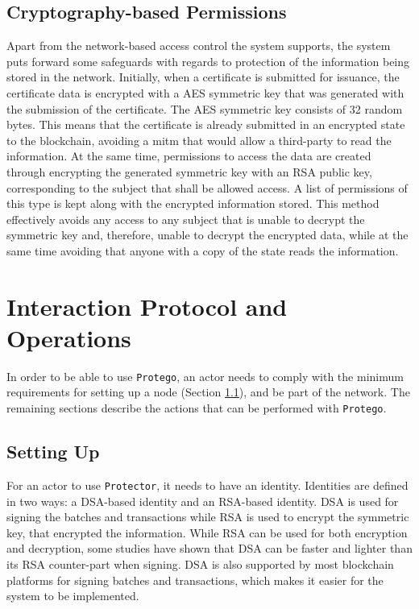\subsection{Cryptography-based Permissions}

Apart from the network-based access control the system supports, the system puts forward some safeguards with regards to protection of the information being stored in the network. Initially, when a certificate is submitted for issuance, the certificate data is encrypted with a AES symmetric key that was generated with the submission of the certificate. The AES symmetric key consists of 32 random bytes. This means that the certificate is already submitted in an encrypted state to the blockchain, avoiding a \gls{mitm} that would allow a third-party to read the information. At the same time, permissions to access the data are created through encrypting the generated symmetric key with an RSA public key, corresponding to the subject that shall be allowed access. A list of permissions of this type is kept along with the encrypted information stored. This method effectively avoids any access to any subject that is unable to decrypt the symmetric key and, therefore, unable to decrypt the encrypted data, while at the same time avoiding that anyone with a copy of the state reads the information.

\section{Interaction Protocol and Operations}
\label{sec:design-interaction}

In order to be able to use \texttt{Protego}, an actor needs to comply with the minimum requirements for setting up a node (Section \ref{sec:design-setup}), and be part of the network. The remaining sections describe the actions that can be performed with \texttt{Protego}.

\subsection{Setting Up}
\label{sec:design-setup}

For an actor to use \texttt{Protector}, it needs to have an identity. Identities are defined in two ways: a DSA-based identity and an RSA-based identity. DSA is used for signing the batches and transactions while RSA is used to encrypt the symmetric key, that encrypted the information. While RSA can be used for both encryption and decryption, some studies have shown that DSA can be faster and lighter than its RSA counter-part when signing. DSA is also supported by most blockchain platforms for signing batches and transactions, which makes it easier for the system to be implemented.

